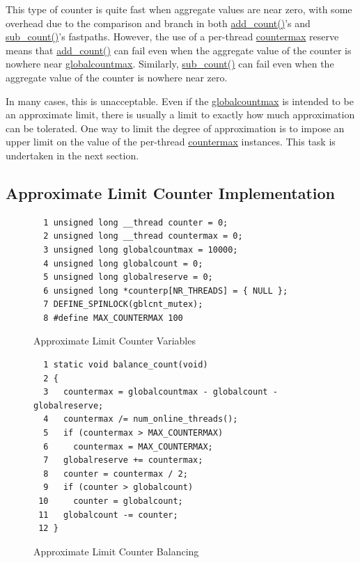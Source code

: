 This type of counter is quite fast when aggregate values are near zero,
with some overhead due to the comparison and branch in both
\url{add_count()}'s and \url{sub_count()}'s fastpaths.
However, the use of a per-thread \url{countermax} reserve means that
\url{add_count()} can fail even when
the aggregate value of the counter is nowhere near \url{globalcountmax}.
Similarly, \url{sub_count()} can fail
even when the aggregate value of the counter is nowhere near zero.

In many cases, this is unacceptable.
Even if the \url{globalcountmax} is intended to be an approximate limit,
there is usually a limit to exactly how much approximation can be tolerated.
One way to limit the degree of approximation is to impose an upper limit
on the value of the per-thread \url{countermax} instances.
This task is undertaken in the next section.

\subsection{Approximate Limit Counter Implementation}
\label{sec:count:Approximate Limit Counter Implementation}

\begin{figure}[tbp]
{ \scriptsize
\begin{verbatim}
  1 unsigned long __thread counter = 0;
  2 unsigned long __thread countermax = 0;
  3 unsigned long globalcountmax = 10000;
  4 unsigned long globalcount = 0;
  5 unsigned long globalreserve = 0;
  6 unsigned long *counterp[NR_THREADS] = { NULL };
  7 DEFINE_SPINLOCK(gblcnt_mutex);
  8 #define MAX_COUNTERMAX 100
\end{verbatim}
}
\caption{Approximate Limit Counter Variables}
\label{fig:count:Approximate Limit Counter Variables}
\end{figure}

\begin{figure}[tbp]
{ \scriptsize
\begin{verbatim}
  1 static void balance_count(void)
  2 {
  3   countermax = globalcountmax - globalcount - globalreserve;
  4   countermax /= num_online_threads();
  5   if (countermax > MAX_COUNTERMAX)
  6     countermax = MAX_COUNTERMAX;
  7   globalreserve += countermax;
  8   counter = countermax / 2;
  9   if (counter > globalcount)
 10     counter = globalcount;
 11   globalcount -= counter;
 12 }
\end{verbatim}
}
\caption{Approximate Limit Counter Balancing}
\label{fig:count:Approximate Limit Counter Balancing}
\end{figure}

